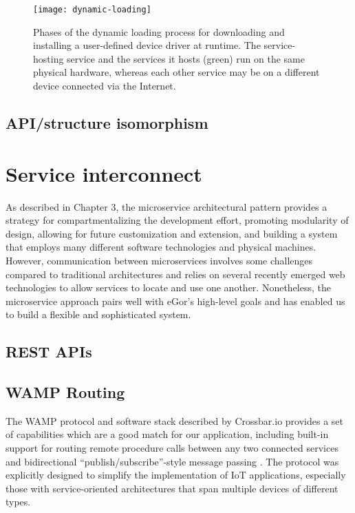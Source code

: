 \documentclass[../thesis]{subfiles}
\begin{document}
\begin{figure}
  \texttt{[image: dynamic-loading]}
  \caption{
    Phases of the dynamic loading process for downloading and
    installing a user-defined device driver at runtime. The
    service-hosting service and the services it hosts (green)
    run on the same physical hardware, whereas each other service may
    be on a different device connected via the Internet.
    \label{fig:DynamicLoading}
  }
\end{figure}

\subsection{API/structure isomorphism}



\section{Service interconnect}

As described in Chapter 3, the microservice architectural pattern
provides a strategy for compartmentalizing the development effort,
promoting modularity of design, allowing for future customization and
extension, and building a system that employs many different software
technologies and physical machines. However, communication between
microservices involves some challenges compared to traditional
architectures and relies on several recently emerged web technologies
to allow services to locate and use one another. Nonetheless,
the microservice approach pairs well with eGor's high-level goals and
has enabled us to build a flexible and sophisticated system.

\subsection{REST APIs}



\subsection{WAMP Routing}
The \gls{WAMP} protocol and software stack described by Crossbar.io
\cite{CrossbarIO} provides a set of capabilities which are a good
match for our application, including built-in support for routing
remote procedure calls between any two connected services and
bidirectional ``publish/subscribe''-style message passing
\cite{WAMP}. The protocol was explicitly designed to simplify the
implementation of \gls{IoT} applications, especially those with
service-oriented architectures that span multiple devices of different
types.
\end{document}
